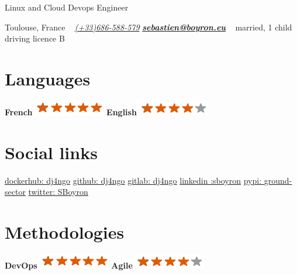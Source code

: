 \documentclass[]{friggeri-cv}
\begin{document}
    {Linux and Cloud Devops Engineer}


\begin{aside}
        Toulouse, France
        ~
	\href{tel:+33686588579}{\textit{(+33)686-588-579}}
	\href{mailto:sebastien@boyron.eu}{\textit{\textbf{sebastien@boyron.eu}}}
        ~
        married, 1 child 
        driving licence B
    \section{Languages}
        \textbf{French}\includegraphics[scale=0.40]{img/5stars.png}
        \textbf{English}\includegraphics[scale=0.40]{img/4stars.png}
        ~
    \section{Social links}
        \href{https://hub.docker.com/u/dj4ngo/}{dockerhub: \underline{dj4ngo}}
	\href{https://github.com/dj4ngo}{github: \underline{dj4ngo}}
        \href{https://gitlab.com/dj4ngo}{gitlab: \underline{dj4ngo}}
	\href{https://www.linkedin.com/in/sboyron/}{linkedin :\underline{sboyron}}
	\href{https://pypi.org/user/ground-sector/}{pypi: \underline{ground-sector}}
        \href{https://twitter.com/SBoyron}{twitter: \underline{SBoyron}}
        ~
    \section{Methodologies}
        \textbf{DevOps}\includegraphics[scale=0.40]{img/5stars.png}
        \textbf{Agile}\includegraphics[scale=0.40]{img/4stars.png}
        ~

\end{aside}
\end{document}
